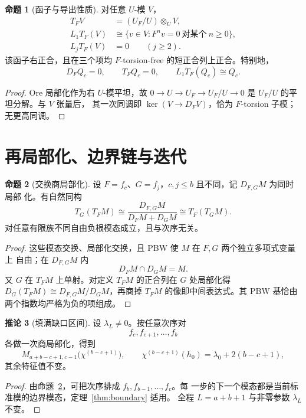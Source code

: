 \documentclass[UTF8,11pt]{ctexart}
\theoremstyle{definition}
\newtheorem{proposition}{命题}[section]
\newtheorem{corollary}[proposition]{推论}
\begin{document}
\begin{proposition}[函子与导出性质]\label{prop:derived}
对任意 \(U\)-模 \(V\)，
\begin{align*}
T_FV&=(U_F/U)\otimes_UV,\\
L_1T_F(V)&\cong\{v\in V:F^nv=0\ \text{对某个}\ n\ge0\},\\
L_jT_F(V)&=0\qquad(j\ge2).
\end{align*}
该函子右正合，且在三个项均 \(F\)-torsion-free 的短正合列上正合。特别地，
\[
D_FQ_c=0,\qquad T_FQ_c=0,\qquad L_1T_F(Q_c)\cong Q_c.
\]
\end{proposition}

\begin{proof}
Ore 局部化作为右 \(U\)-模平坦，故
\(0\to U\to U_F\to U_F/U\to0\) 是 \(U_F/U\) 的平坦分解。与 \(V\) 张量后，
其一次同调即 \(\ker(V\to D_FV)\)，恰为 \(F\)-torsion 子模；无更高同调。
\end{proof}

\section{再局部化、边界链与迭代}\label{sec:chains}

\begin{proposition}[交换商局部化]\label{prop:commuting}
设 \(F=f_c\)、\(G=f_j\)，\(c,j\le b\) 且不同，记 \(D_{F,G}M\) 为同时局部
化。有自然同构
\[
T_G(T_FM)\cong
\frac{D_{F,G}M}{D_FM+D_GM}
\cong T_F(T_GM).
\]
对任意有限族不同自由负根模态成立，且与次序无关。
\end{proposition}

\begin{proof}
这些模态交换、局部化交换，且 PBW 使 \(M\) 在 \(F,G\) 两个独立多项式变量上
自由；在 \(D_{F,G}M\) 内
\[
D_FM\cap D_GM=M.
\]
又 \(G\) 在 \(T_FM\) 上单射。对定义 \(T_FM\) 的正合列在 \(G\) 处局部化得
\(D_G(T_FM)\cong D_{F,G}M/D_GM\)，再商掉 \(T_FM\) 的像即中间表达式。其 PBW
基恰由两个指数均严格为负的项组成。
\end{proof}

\begin{corollary}[填满缺口区间]\label{cor:fill}
设 \(\lambda_L\ne0\)。按任意次序对
\[
f_c,f_{c+1},\ldots,f_b
\]
各做一次商局部化，得到
\[
M_{a+b-c+1,c-1}\bigl(\chi^{(b-c+1)}\bigr),
\qquad
\chi^{(b-c+1)}(h_0)=\lambda_0+2(b-c+1),
\]
其余特征值不变。
\end{corollary}

\begin{proof}
由命题~\ref{prop:commuting}，可把次序排成 \(f_b,f_{b-1},\ldots,f_c\)。每
一步的下一个模态都是当前标准模的边界模态，定理~\ref{thm:boundary} 适用。
全程 \(L=a+b+1\) 与非零参数 \(\lambda_L\) 不变。
\end{proof}
\end{document}
